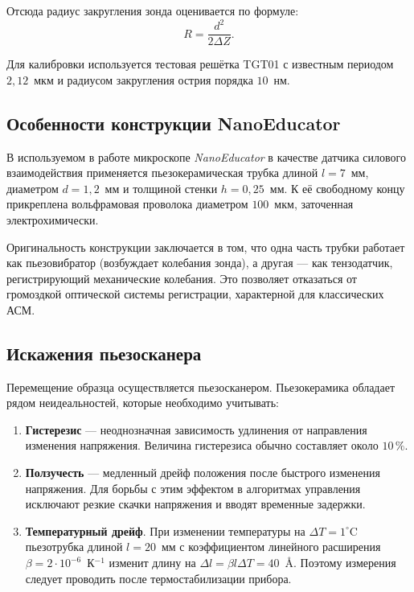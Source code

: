 \documentclass[12pt, a4paper]{article}
\begin{document}
Отсюда радиус закругления зонда оценивается по формуле:
\begin{equation}
    R = \frac{d^2}{2\Delta Z}.
    \label{eq:tip_radius}
\end{equation}

Для калибровки используется тестовая решётка TGT01 с известным периодом $2{,}12$~мкм и радиусом закругления острия порядка $10$~нм.


\subsection*{Особенности конструкции NanoEducator}
В используемом в работе микроскопе \textit{NanoEducator} в качестве датчика силового взаимодействия применяется пьезокерамическая трубка длиной $l = 7$~мм, диаметром $d = 1,2$~мм и толщиной стенки $h = 0,25$~мм. К её свободному концу прикреплена вольфрамовая проволока диаметром $100$~мкм, заточенная электрохимически. 

Оригинальность конструкции заключается в том, что одна часть трубки работает как пьезовибратор (возбуждает колебания зонда), а другая --- как тензодатчик, регистрирующий механические колебания. Это позволяет отказаться от громоздкой оптической системы регистрации, характерной для классических АСМ.

\subsection*{Искажения пьезосканера}
Перемещение образца осуществляется пьезосканером. Пьезокерамика обладает рядом неидеальностей, которые необходимо учитывать:
\begin{enumerate}
    \item \textbf{Гистерезис} --- неоднозначная зависимость удлинения от направления изменения напряжения. Величина гистерезиса обычно составляет около $10\,\%$.
    \item \textbf{Ползучесть} --- медленный дрейф положения после быстрого изменения напряжения. Для борьбы с этим эффектом в алгоритмах управления исключают резкие скачки напряжения и вводят временные задержки.
    \item \textbf{Температурный дрейф}. При изменении температуры на $\Delta T = 1^\circ$C пьезотрубка длиной $l = 20$~мм с коэффициентом линейного расширения $\beta = 2 \cdot 10^{-6}$~К$^{-1}$ изменит длину на $\Delta l = \beta l \Delta T = 40$~\AA. Поэтому измерения следует проводить после термостабилизации прибора.
\end{enumerate}
\end{document}
